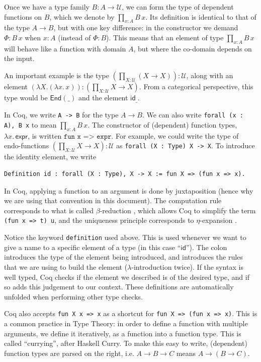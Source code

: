 \documentclass[12 pt]{amsart}
\theoremstyle{definition}
\theoremstyle{remark}
\newcommand{\Type}{\mathcal{U}}
\newcommand{\id}{{\mathsf{id}}}
\begin{document}
Once we have a type family $B : A\to \mathcal{U}$, we can form the type of dependent functions on $B$, which we denote by $\prod_{x : A} B\,x$. Its definition is identical to that of the type $A \to B$, but with one key difference: in the constructor we demand $\Phi : B\,x$ when $x : A$ (instead of $\Phi : B$). This means that an element of type $\prod_{x : A} B\,x$ will behave like a function with domain $A$, but where the co-domain depends on the input.

An important example is the type $\left(\prod_{X:\Type}(X\to X)\right): \Type$, along with an element $\left(\lambda X. (\lambda x. \,x)\right) : \left(\prod_{X:\Type}X\to X \right)$. From a categorical perspective, this type would be $\mathsf{End}(\_)$ and the element $\mathsf{id}_{\_}$.

In Coq, we write \texttt{A -> B} for the type $A\to B$. We can also write \texttt{forall (x : A), B x} to mean $\prod_{x : A} B\,x$. The constructor of (dependent) function types, $\lambda x. \, \mathsf{expr}$, is written $\texttt{fun x => expr}$. For example, we could write the type of endo-functions $\left(\prod_{X:\Type}X\to X \right): \Type$ as \texttt{forall (X : Type) X -> X}. To introduce the identity element, we write

\begin{lstlisting}
Definition id : forall (X : Type), X -> X := fun X => (fun x => x).
\end{lstlisting} 

In Coq, applying a function to an argument is done by juxtaposition (hence why we are using that convention in this document). The computation rule corresponds to what is called $\beta$-reduction \cite[Conversion Rules]{coq-refman-8.19}, which allows Coq to simplify the term \texttt{(fun x => t) u}, and the uniqueness principle corresponds to $\eta$-expansion \cite[Conversion Rules]{coq-refman-8.19}.

Notice the keyword \texttt{definition} used above. This is used whenever we want to give a name to a specific element of a type (in this case ``$\id$''). The colon introduces the type of the element being introduced, and \mathsf{:=} introduces the rules that we are using to build the element ($\lambda$-introduction twice). If the syntax is well typed, Coq checks if the element we described is of the desired type, and if so adds this judgement to our context. These definitions are automatically unfolded when performing other type checks.

Coq also accepts \texttt{fun X x => x} as a shortcut for \texttt{fun X => (fun x => x)}. This is a common practice in Type Theory: in order to define a function with multiple arguments, we define it iteratively, as a function into a function type. This is called ``currying'', after Haskell Curry. To make this easy to write, (dependent) function types are parsed on the right, i.e. $A \to B \to C$ means $A \to (B \to C)$. 
\end{document}

